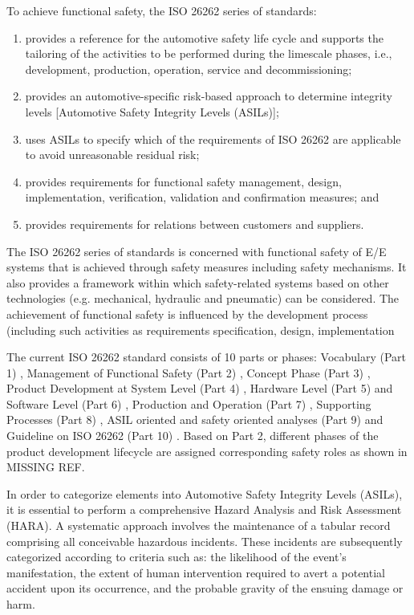 \documentclass[./dissertation.tex]{subfiles}
\begin{document}
To achieve functional safety, the ISO 26262 series of standards:
\begin{enumerate}
\item provides a reference for the automotive safety life cycle and supports the tailoring of the activities to be performed during the limescale phases, i.e., development, production, operation, service and decommissioning;
\item provides an automotive-specific risk-based approach to determine integrity levels [Automotive Safety Integrity Levels (ASILs)];
\item uses ASILs to specify which of the requirements of ISO 26262 are applicable to avoid unreasonable residual risk;
\item provides requirements for functional safety management, design, implementation, verification, validation and confirmation measures; and
\item provides requirements for relations between customers and suppliers.
\end{enumerate}

The ISO 26262 series of standards is concerned with functional safety of E/E systems that is achieved through safety measures including safety mechanisms. It also provides a framework within which safety-related systems based on other technologies (e.g. mechanical, hydraulic and pneumatic) can be considered. The achievement of functional safety is influenced by the development process (including such activities as requirements specification, design, implementation

The current ISO 26262 standard consists of 10 parts or phases: Vocabulary (Part 1) \cite{iso26262-1}, Management of Functional Safety (Part 2) \cite{iso26262-2}, Concept Phase (Part 3) \cite{iso26262-3}, Product Development at System Level (Part 4) \cite{iso26262-4}, Hardware Level (Part 5) \cite{iso26262-5} and Software Level (Part 6) \cite{iso26262-6}, Production and Operation (Part 7) \cite{iso26262-7}, Supporting Processes (Part 8) \cite{iso26262-8}, ASIL oriented and safety oriented analyses (Part 9) \cite{iso26262-9} and Guideline on ISO 26262 (Part 10) \cite{iso26262-10}. Based on Part 2, different phases of the product development lifecycle are assigned corresponding safety roles as shown in MISSING REF.

In order to categorize elements into Automotive Safety Integrity Levels (ASILs), it is essential to perform a comprehensive Hazard Analysis and Risk Assessment (HARA). A systematic approach involves the maintenance of a tabular record comprising all conceivable hazardous incidents. These incidents are subsequently categorized according to criteria such as: the likelihood of the event's manifestation, the extent of human intervention required to avert a potential accident upon its occurrence, and the probable gravity of the ensuing damage or harm.
\end{document}
